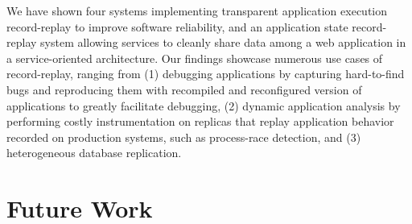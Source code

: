We have shown four systems implementing transparent application execution
record-replay to improve software reliability, and an application state
record-replay system allowing services to cleanly share data among a web
application in a service-oriented architecture. Our findings showcase numerous
use cases of record-replay, ranging from (1) debugging applications by capturing
hard-to-find bugs and reproducing them with recompiled and reconfigured version
of applications to greatly facilitate debugging, (2) dynamic application
analysis by performing costly instrumentation on replicas that replay
application behavior recorded on production systems, such as process-race
detection, and (3) heterogeneous database replication.

\section{Future Work}

